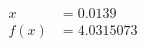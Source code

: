 \documentclass[preview]{standalone}
\begin{document}
\begin{align*}
x &= 0.0139\\f(x) &= 4.0315073
\end{align*}
\end{document}
